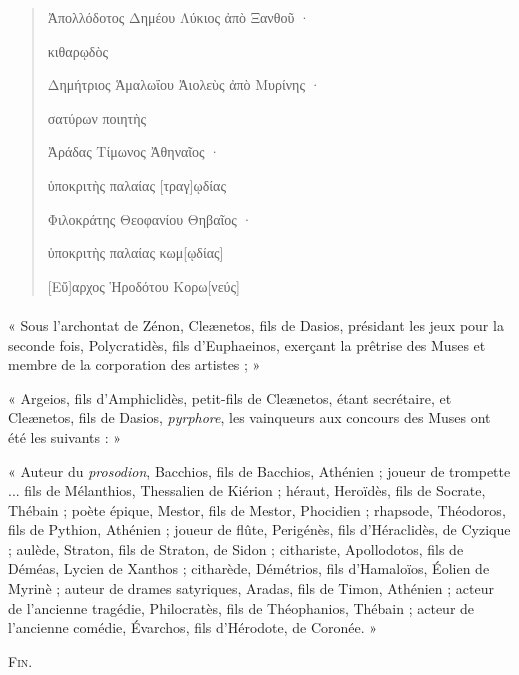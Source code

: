 \documentclass[landscape, a4paper, 11pt, oneside, polutonikogreek, french]{article}
\begin{document}
\begin{quotation}
Ἀπολλόδοτος Δημέου Λύκιος ἀπὸ Ξανθοῦ ·

\hspace*{5mm}κιθαρῳδὸς

Δημήτριος Ἁμαλωΐου Ἀιολεὺς ἀπὸ Μυρίνης ·

\hspace*{5mm}σατύρων ποιητὴς

Ἀράδας Τίμωνος Ἀθηναῖος ·

\hspace*{5mm}ὑποκριτὴς παλαίας [τραγ]ῳδίας

Φιλοκράτης Θεοφανίου Θηβαῖος ·

\hspace*{5mm}ὑποκριτὴς παλαίας κωμ[ῳδίας]

[Εὔ]αρχος Ἡροδότου Κορω[νεύς]
\end{quotation}
\paragraph{}
« Sous l'archontat de Zénon, Cleænetos, fils de Dasios, présidant les jeux pour la seconde fois, Polycratidès, fils d'Euphaeinos, exerçant la prêtrise des Muses et membre de la corporation des artistes ; »

« Argeios, fils d'Amphiclidès, petit-fils de Cleænetos, étant secrétaire, et Cleænetos, fils de Dasios, \emph{pyrphore}, les vainqueurs aux concours des Muses ont été les suivants : »

« Auteur du \emph{prosodion}, Bacchios, fils de Bacchios, Athénien ; joueur de trompette ... fils de Mélanthios, Thessalien de Kiérion ; héraut, Heroïdès, fils de Socrate, Thébain ; poète épique, Mestor, fils de Mestor, Phocidien ; rhapsode, Théodoros, fils de Pythion, Athénien ; joueur de flûte, Perigénès, fils d'Héraclidès, de Cyzique ; aulède, Straton, fils de Straton, de Sidon ; cithariste, Apollodotos, fils de Déméas, Lycien de Xanthos ; citharède, Démétrios, fils d'Hamaloïos, Éolien de Myrinè ; auteur de drames satyriques, Aradas, fils de Timon, Athénien ; acteur de l'ancienne tragédie, Philocratès, fils de Théophanios, Thébain ; acteur de l'ancienne comédie, Évarchos, fils d'Hérodote, de Coronée. »

\bigskip

\begin{center}
\textsc{Fin.}
\end{center}
\end{document}
